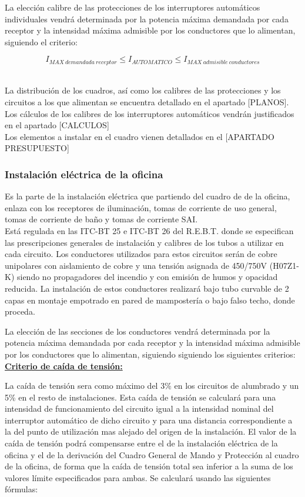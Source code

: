 La elección calibre de las protecciones de los interruptores automáticos individuales vendrá determinada por la potencia máxima demandada por cada receptor y la intensidad máxima admisible por los conductores que lo alimentan, siguiendo el criterio:\

$$ I_{MAX\ demandada\ receptor}\leq I_{AUTOMATICO}\leq I_{MAX\ admisible\ conductores}$$\

La distribución de los cuadros, así como los calibres de las protecciones y los circuitos a los que alimentan se encuentra detallado en el apartado [PLANOS]. Los cálculos de los calibres de los interruptores automáticos vendrán justificados en el apartado [CALCULOS]\\

Los elementos a instalar en el cuadro vienen detallados en el [APARTADO PRESUPUESTO]\

\subsubsection{Instalación eléctrica de la oficina}

Es la parte de la instalación eléctrica que partiendo del cuadro de de la oficina, enlaza con los receptores de iluminación, tomas de corriente de uso general, tomas de corriente de baño y tomas de corriente SAI.\\

Está regulada en las ITC-BT 25 e ITC-BT 26 del R.E.B.T. donde se especifican las prescripciones generales de instalación y calibres de los tubos a utilizar en cada circuito. Los conductores utilizados para estos circuitos serán de cobre unipolares con aislamiento de cobre y una tensión asignada de 450/750V (H07Z1-K) siendo no propagadores del incendio y con emisión de humos y opacidad reducida. La instalación de estos conductores realizará bajo tubo curvable de 2 capas en montaje empotrado en pared de mampostería o bajo falso techo, donde proceda.\\

\pagebreak

La elección de las secciones de los conductores vendrá determinada por la potencia máxima demandada por cada receptor y la intensidad máxima admisible por los conductores que lo alimentan, siguiendo siguiendo los siguientes criterios:\\

\underline{\bfseries Criterio de caída de tensión:}\

La caída de tensión sera como máximo del 3\% en los circuitos de alumbrado y un 5\% en el resto de instalaciones. Esta caída de tensión se calculará para una intensidad de funcionamiento del circuito igual a la intensidad nominal del interruptor automático de dicho circuito y para una distancia correspondiente a la del punto de utilización mas alejado del origen de la instalación. El valor de la caída de tensión podrá compensarse entre el de la instalación eléctrica de la oficina y el de la derivación del Cuadro General de Mando y Protección al cuadro de la oficina, de forma que la caída de tensión total sea inferior a la suma de los valores límite especificados para ambas. Se calculará usando las siguientes fórmulas:\\

